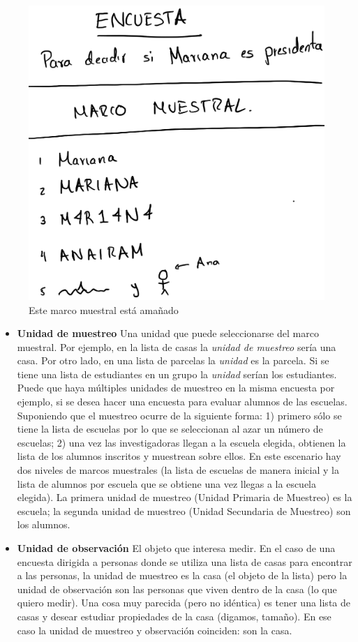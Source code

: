 \documentclass[
]{book}
\begin{document}
\begin{figure}
\centering
\includegraphics{images/samplingframe.png}
\caption{Este marco muestral está amañado}
\end{figure}

\begin{itemize}
\item
  \textbf{Unidad de muestreo} Una unidad que puede seleccionarse del marco muestral. Por ejemplo, en la lista de casas la \emph{unidad de muestreo} sería una casa. Por otro lado, en una lista de parcelas la \emph{unidad} es la parcela. Si se tiene una lista de estudiantes en un grupo la \emph{unidad} serían los estudiantes. Puede que haya múltiples unidades de muestreo en la misma encuesta por ejemplo, si se desea hacer una encuesta para evaluar alumnos de las escuelas. Suponiendo que el muestreo ocurre de la siguiente forma: 1) primero sólo se tiene la lista de escuelas por lo que se seleccionan al azar un número de escuelas; 2) una vez las investigadoras llegan a la escuela elegida, obtienen la lista de los alumnos inscritos y muestrean sobre ellos. En este escenario hay dos niveles de marcos muestrales (la lista de escuelas de manera inicial y la lista de alumnos por escuela que se obtiene una vez llegas a la escuela elegida). La primera unidad de muestreo (Unidad Primaria de Muestreo) es la escuela; la segunda unidad de muestreo (Unidad Secundaria de Muestreo) son los alumnos.
\item
  \textbf{Unidad de observación} El objeto que interesa medir. En el caso de una encuesta dirigida a personas donde se utiliza una lista de casas para encontrar a las personas, la unidad de muestreo es la casa (el objeto de la lista) pero la unidad de observación son las personas que viven dentro de la casa (lo que quiero medir). Una cosa muy parecida (pero no idéntica) es tener una lista de casas y desear estudiar propiedades de la casa (digamos, tamaño). En ese caso la unidad de muestreo y observación coinciden: son la casa.
\end{itemize}
\end{document}
